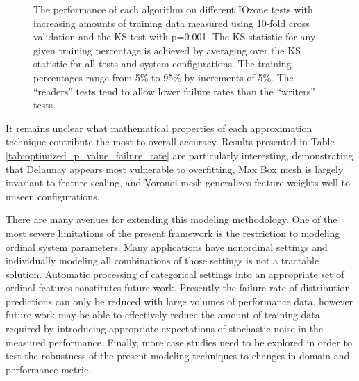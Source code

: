 \documentclass[letterpaper, 10 pt, conference]{ieeeconf}  %
\begin{document}
\begin{figure}
  \caption{The performance of each algorithm on different IOzone tests with increasing amounts of training data measured using 10-fold cross validation and the KS test with p=0.001. The KS statistic for any given training percentage is achieved by averaging over the KS statistic for all tests and system configurations. The training percentages range from 5\% to 95\% by increments of 5\%. The ``readers'' tests tend to allow lower failure rates than the ``writers'' tests.
  \vspace{-.1cm}}
  \label{fig:ks_failure_by_training_and_test}
\end{figure}


It remains unclear what mathematical properties of each approximation technique contribute the most to overall accuracy. Results presented in Table \ref{tab:optimized_p_value_failure_rate} are particularly interesting, demonstrating that Delaunay appears most vulnerable to overfitting, Max Box mesh is largely invariant to feature scaling, and Voronoi mesh generalizes feature weights well to unseen configurations.

There are many avenues for extending this modeling methodology. One of the most severe limitations of the present framework is the restriction to modeling ordinal system parameters. Many applications have nonordinal settings and individually modeling all combinations of those settings is not a tractable solution. Automatic processing of categorical settings into an appropriate set of ordinal features constitutes future work. Presently the failure rate of distribution predictions can only be reduced with large volumes of performance data, however future work may be able to effectively reduce the amount of training data required by introducing appropriate expectations of stochastic noise in the measured performance. Finally, more case studies need to be explored in order to test the robustness of the present modeling techniques to changes in domain and performance metric.
\end{document}
